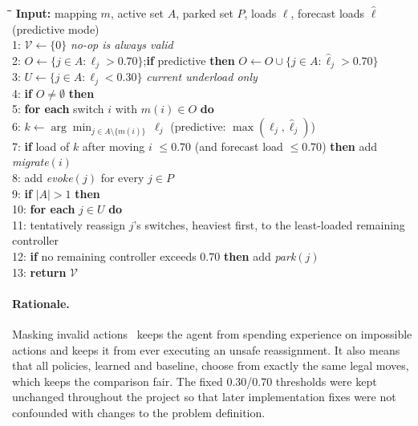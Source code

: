 \begin{algorithm}[htbp]
\caption{Valid-action set $\mathcal{V}(s_t)$}
\label{alg:valid}
\small
\begin{tabbing}
\hspace{1.2em}\=\hspace{1.2em}\=\hspace{1.2em}\=\kill
\textbf{Input:} mapping $m$, active set $A$, parked set $P$, loads $\bm{\ell}$, forecast loads $\hat{\bm{\ell}}$ (predictive mode)\\
1:\> $\mathcal{V}\leftarrow\{0\}$ \hfill \emph{no-op is always valid}\\
2:\> $O\leftarrow\{j\in A:\ell_j>0.70\}$;\quad \textbf{if} predictive \textbf{then} $O\leftarrow O\cup\{j\in A:\hat\ell_j>0.70\}$\\
3:\> $U\leftarrow\{j\in A:\ell_j<0.30\}$ \hfill \emph{current underload only}\\
4:\> \textbf{if} $O\neq\emptyset$ \textbf{then}\\
5:\>\> \textbf{for each} switch $i$ with $m(i)\in O$ \textbf{do}\\
6:\>\>\> $k\leftarrow\arg\min_{j\in A\setminus\{m(i)\}}\ \ell_j$ \quad (predictive: $\max(\ell_j,\hat\ell_j)$)\\
7:\>\>\> \textbf{if} load of $k$ after moving $i$ $\le0.70$ (and forecast load $\le0.70$) \textbf{then} add \emph{migrate}$(i)$\\
8:\>\> add \emph{evoke}$(j)$ for every $j\in P$\\
9:\> \textbf{if} $|A|>1$ \textbf{then}\\
10:\>\> \textbf{for each} $j\in U$ \textbf{do}\\
11:\>\>\> tentatively reassign $j$'s switches, heaviest first, to the least-loaded remaining controller\\
12:\>\>\> \textbf{if} no remaining controller exceeds $0.70$ \textbf{then} add \emph{park}$(j)$\\
13:\> \textbf{return} $\mathcal{V}$
\end{tabbing}
\end{algorithm}

\paragraph{Rationale.} Masking invalid actions~\cite{huang2022masking} keeps the agent from spending experience on impossible actions and keeps it from ever executing an unsafe reassignment. It also means that all policies, learned and baseline, choose from exactly the same legal moves, which keeps the comparison fair. The fixed 0.30/0.70 thresholds were kept unchanged throughout the project so that later implementation fixes were not confounded with changes to the problem definition.

